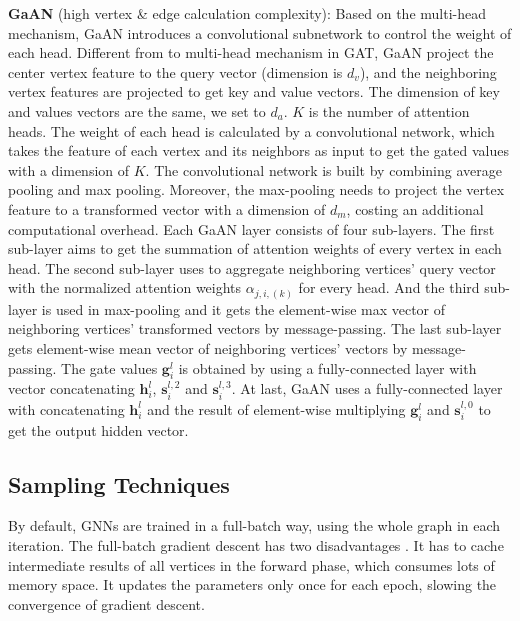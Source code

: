 \textbf{GaAN} (high vertex \& edge calculation complexity):
Based on the multi-head mechanism, GaAN introduces a convolutional subnetwork to control the weight of each head. Different from to multi-head mechanism in GAT, GaAN project the center vertex feature to the query vector (dimension is $d_v$), and
the neighboring vertex features are projected to get key and value vectors. The dimension of key and values vectors are the same, we set to $d_a$.
$K$ is the number of attention heads. The weight of each head is calculated by a convolutional network, which takes the feature of each vertex and its neighbors as input to get the gated values with a dimension of $K$.
The convolutional network is built by combining average pooling and max pooling. Moreover, the max-pooling needs to project the vertex feature to a transformed vector with a dimension of $d_m$, costing an additional computational overhead.
Each GaAN layer consists of four sub-layers. The first sub-layer aims to get the summation of attention weights of every vertex in each head.
The second sub-layer uses to aggregate neighboring vertices' query vector with the normalized attention weights $\alpha_{j, i, (k)}$ for every head.
And the third sub-layer is used in max-pooling and it gets the element-wise max vector of neighboring vertices' transformed vectors by message-passing.
The last sub-layer gets element-wise mean vector of neighboring vertices' vectors by message-passing. The gate values $\boldsymbol{g}^l_i$ is obtained by using a fully-connected layer with vector concatenating $\boldsymbol{h}^{l}_i$, $\boldsymbol{s}^{l, 2}_i$ and $\boldsymbol{s}^{l, 3}_i$.
At last, GaAN uses a fully-connected layer with concatenating $\boldsymbol{h}^{l}_i$ and the result of element-wise multiplying $\boldsymbol{g}^{l}_i$ and $\boldsymbol{s}^{l, 0}_i$ to get the output hidden vector.

\subsection{Sampling Techniques}

By default, GNNs are trained in a full-batch way, using the whole graph in each iteration.
The full-batch gradient descent has two disadvantages \cite{chiang2019_cluster_gcn}.
It has to cache intermediate results of all vertices in the forward phase, which consumes lots of memory space.
It updates the parameters only once for each epoch, slowing the convergence of gradient descent.

